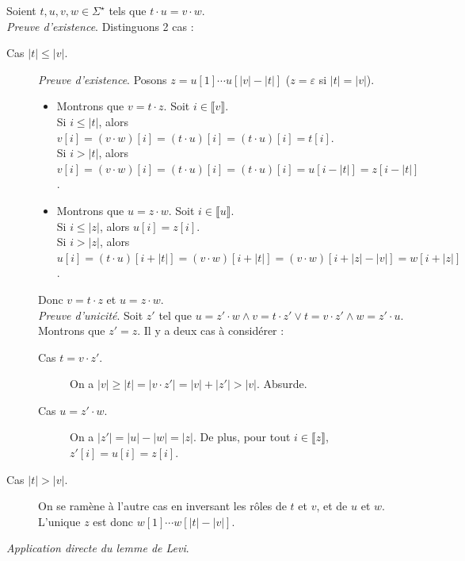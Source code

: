\begin{corrections}

  \begin{questions}
  \item Soient $t, u, v, w \in \Sigma^\star$ tels que $t\cdot u = v\cdot w$.\\
    \emph{Preuve d'existence}. Distinguons 2 cas :
    \begin{description}
    \item[Cas $|t| \le |v|$.] \emph{Preuve d'existence}. Posons $z = u[1]\cdots u[|v| - |t|]$ ($z=\varepsilon$ si $|t| = |v|$).
      \begin{itemize}
      \item Montrons que $v=t\cdot z$. Soit $i \in \llbracket v \rrbracket$. \\
        Si $i \le |t|$, alors $v[i] = (v\cdot w)[i] = (t\cdot u)[i] = (t\cdot u)[i] = t[i]$. \\
        Si $i > |t|$, alors $v[i] = (v\cdot w)[i] = (t\cdot u)[i] = (t\cdot u)[i] = u[i-|t|] = z[i-|t|]$.
      \item Montrons que $u=z\cdot w$. Soit $i \in \llbracket u \rrbracket$. \\
        Si $i \le |z|$, alors $u[i] = z[i]$. \\
        Si $i > |z|$, alors $u[i] = (t\cdot u)[i+|t|] = (v\cdot w)[i+|t|] = (v\cdot w)[i+|z|-|v|] = w[i+|z|]$.
      \end{itemize}
      Donc $v=t\cdot z$ et $u=z\cdot w$. \\
      \emph{Preuve d'unicité}. Soit $z'$ tel que $u = z'\cdot w \land v = t\cdot z' \lor t = v\cdot z'\land w = z'\cdot u$. \\
      Montrons que $z'=z$. Il y a deux cas à considérer :
      \begin{description}
      \item[Cas $t = v\cdot z'$.] On a $|v| \ge |t| = |v\cdot z'| = |v| + |z'| > |v|$. Absurde. 
      \item[Cas $u = z'\cdot w$.] On a $|z'| = |u| - |w| = |z|$.
        De plus, pour tout $i \in \llbracket z \rrbracket$, $z'[i] = u[i] = z[i]$.
      \end{description}
    \item[Cas $|t| > |v|$.] On se ramène à l'autre cas en inversant les rôles de $t$ et $v$, et de $u$ et $w$.\\
      L'unique $z$ est donc $w[1]\cdots w[|t| - |v|]$. 
    \end{description}
  \item \emph{Application directe du lemme de Levi}.\\

\end{questions}
\end{corrections}

